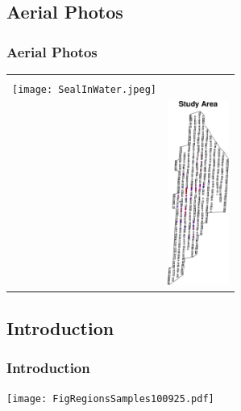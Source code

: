 \documentclass[mathserif,compress]{beamer}
\begin{document}
\subsection{Aerial Photos}
\begin{frame} 
\frametitle{Aerial Photos}
     
	\begin{tabular} {p{5.8cm} p{3.8cm}}

		{
		\begin{center}
		  \vspace{-.5cm}
			\texttt{[image: aerialPhoto.jpeg]}  \\
		  \vspace{.5cm}
			\texttt{[image: SealInWater.jpeg]}  \\
		\end{center}
		} &
		{
			\vspace{-.5cm}
			\includegraphics[width=2.0cm]{RawPlotsColoredCrop.pdf} 
		}

	\end{tabular}

\end{frame}

\subsection{Introduction}
\begin{frame}
\frametitle{Introduction}

	\begin{center} 
		\texttt{[image: FigRegionsSamples100925.pdf]} 
	\end{center}

\end{frame}

\end{document}
